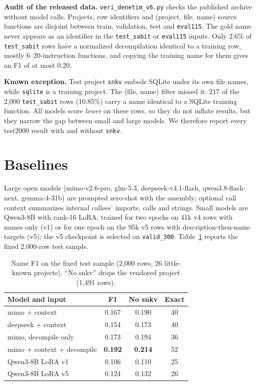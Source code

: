 \documentclass[conference]{IEEEtran}
\begin{document}
\textbf{Audit of the released data.} \texttt{veri\_denetim\_v6.py} checks the published archive without model calls. Projects, row identifiers and (project, file, name) source functions are disjoint between train, validation, test and \texttt{eval115}. The gold name never appears as an identifier in the \texttt{test\_sabit} or \texttt{eval115} inputs. Only 2.6\% of \texttt{test\_sabit} rows have a normalized decompilation identical to a training row, mostly 6--20-instruction functions, and copying the training name for them gives an F1 of at most 0.20.

\textbf{Known exception.} Test project \texttt{snkv} embeds SQLite under its own file names, while \texttt{sqlite} is a training project. The (file, name) filter missed it: 217 of the 2,000 \texttt{test\_sabit} rows (10.85\%) carry a name identical to a SQLite training function. All models score \emph{lower} on these rows, so they do not inflate results, but they narrow the gap between small and large models. We therefore report every test2000 result with and without \texttt{snkv}.

\section{Baselines}
Large open models (mimo-v2.6-pro, glm-5.3, deepseek-v4.1-flash, qwen3.8-flash-next, gemma-4-31b) are prompted zero-shot with the assembly; optional call context summarizes internal callees' imports, calls and strings. Small models are Qwen3-8B with rank-16 LoRA, trained for two epochs on 41k v4 rows with names only (v1) or for one epoch on the 95k v5 rows with description-then-name targets (v5); the v5 checkpoint is selected on \texttt{valid\_300}. Table~\ref{tab:base} reports the fixed 2,000-row test sample.

\begin{table}[t]
\centering
\caption{Name F1 on the fixed test sample (2,000 rows, 26 little-known projects). ``No snkv'' drops the vendored project (1,491 rows).}
\label{tab:base}
\begin{tabular}{lccc}
\toprule
Model and input & F1 & No snkv & Exact \\
\midrule
mimo + context & 0.167 & 0.190 & 40 \\
deepseek + context & 0.154 & 0.173 & 40 \\
mimo, decompile only & 0.173 & 0.194 & 36 \\
mimo + context + decompile & \textbf{0.192} & \textbf{0.214} & 52 \\
\midrule
Qwen3-8B LoRA v1 & 0.106 & 0.110 & 25 \\
Qwen3-8B LoRA v5 & 0.124 & 0.132 & 26 \\
\bottomrule
\end{tabular}
\end{table}
\end{document}
